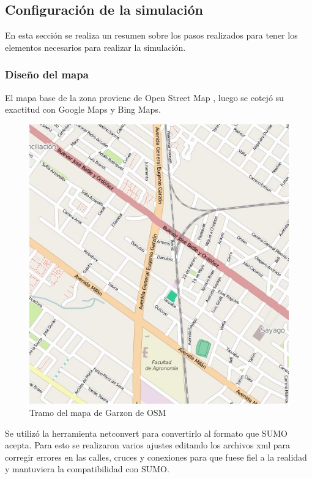 \subsection{Configuración de la simulación}

En esta sección se realiza un resumen sobre los pasos realizados para tener los elementos necesarios para realizar la simulación.

\subsubsection{Diseño del mapa}


El mapa base de la zona proviene de Open Street Map \citep{OSM}, luego se cotejó su exactitud con Google Maps y Bing Maps.

\begin{figure}[H]
\centering
\includegraphics[width=0.7\linewidth]{Figures/osm_garzon}
\caption{Tramo del mapa de Garzon de OSM}
\label{fig:osm_garzon}
\end{figure}


Se utilizó la herramienta netconvert para convertirlo al formato que SUMO acepta. 
Para esto se realizaron varios ajustes editando los archivos xml para corregir errores en las calles, cruces y conexiones para que fuese fiel a la realidad y mantuviera la compatibilidad con SUMO.


